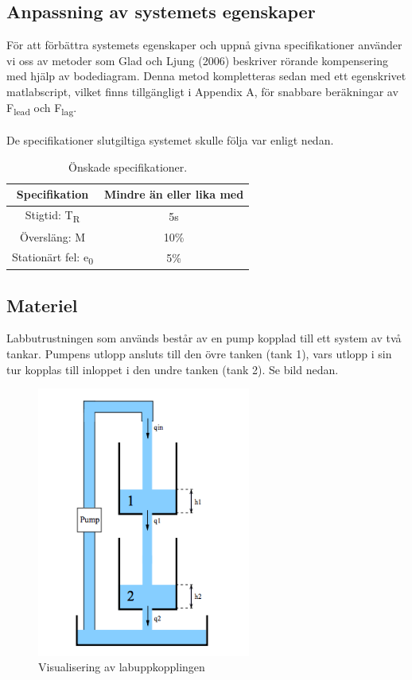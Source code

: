 \documentclass{article}
\begin{document}
\subsection{Anpassning av systemets egenskaper}
För att förbättra systemets egenskaper och uppnå givna specifikationer använder vi oss av metoder som Glad och Ljung (2006) beskriver rörande kompensering med hjälp av bodediagram. Denna metod kompletteras sedan med ett egenskrivet matlabscript, vilket finns tillgängligt i Appendix A, för snabbare beräkningar av F\textsubscript{lead} och F\textsubscript{lag}. 
\\
\\
De specifikationer slutgiltiga systemet skulle följa var enligt nedan. 

\begin{table}[ht] 
\centering 
\begin{tabular}{c c} 
Specifikation & Mindre än eller lika med \\ [0.5ex] %
\hline
Stigtid: T\textsubscript{R} & 5s \\
Översläng: M & 10\% \\
Stationärt fel: e\textsubscript{0} & 5\% \\

\end{tabular} 
\caption{Önskade specifikationer.}
\end{table}

\newpage




\subsection{Materiel}
Labbutrustningen som används består av en pump kopplad till ett system av två tankar. Pumpens utlopp ansluts till den övre tanken (tank 1), vars utlopp i sin tur kopplas till inloppet i den undre tanken (tank 2). Se bild nedan. 

\begin{figure}[ht!]
\centering
\includegraphics[width=70mm]{System.png}
\caption{Visualisering av labuppkopplingen}
\label{overflow}
\end{figure}
\end{document}
